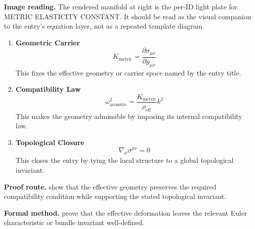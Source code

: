 \begin{samepage}
\noindent\begin{minipage}[t]{0.45\linewidth}
\vspace{0pt}
\raggedright
\scriptsize\textbf{Image reading.} The rendered manifold at right is the per-ID light plate for METRIC ELASTICITY CONSTANT. It should be read as the visual companion to the entry's equation layer, not as a repeated template diagram.\par
\end{minipage}\hfill
\begin{minipage}[t]{0.53\linewidth}
\vspace*{-0.10in}
\raggedright
{}
\end{minipage}
\end{samepage}

\clearpage


\begin{enumerate}[leftmargin=1.6em,itemsep=9pt,topsep=6pt]
\item \textbf{Geometric Carrier}
\[
K_{\mathrm{metric}}
=
\frac{\partial\sigma_{\mu\nu}}{\partial g_{\mu\nu}}
\]
This fixes the effective geometry or carrier space named by the entry title.

\item \textbf{Compatibility Law}
\[
\omega_{\mathrm{acoustic}}^2
=
\frac{K_{\mathrm{metric}}}{\rho_{\mathrm{eff}}}k^2
\]
This makes the geometry admissible by imposing its internal compatibility law.

\item \textbf{Topological Closure}
\[
\nabla_\mu\sigma^{\mu\nu}=0
\]
This closes the entry by tying the local structure to a global topological invariant.
\end{enumerate}

\textbf{Proof route.} show that the effective geometry preserves the required compatibility condition while supporting the stated topological invariant.

\textbf{Formal method.} prove that the effective deformation leaves the relevant Euler characteristic or bundle invariant well-defined.

\medskip
{}

